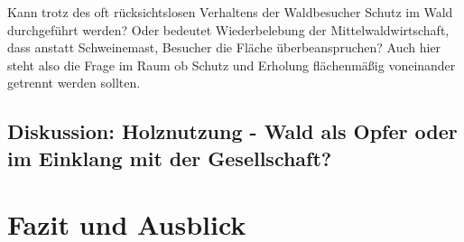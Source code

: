 \documentclass[12pt]{article}
\begin{document}
Kann trotz des oft rücksichtslosen Verhaltens der Waldbesucher Schutz im Wald durchgeführt werden? Oder 
bedeutet Wiederbelebung der Mittelwaldwirtschaft, dass anstatt Schweinemast, Besucher die Fläche überbeanspruchen?
Auch hier steht also die Frage im Raum ob Schutz und Erholung flächenmäßig voneinander getrennt werden 
sollten. 

\subsection*{Diskussion: Holznutzung - Wald als Opfer oder im Einklang mit der Gesellschaft?}

\section*{Fazit und Ausblick}
\end{document}
